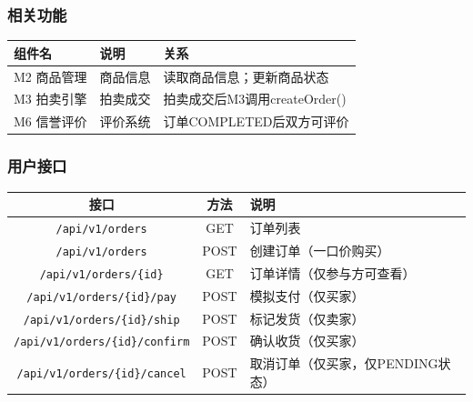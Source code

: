 \documentclass[12pt,a4paper]{ctexart}
\numberwithin{figure}{section}
\numberwithin{table}{section}
\begin{document}
\subsubsection{相关功能}

\begin{center}
\renewcommand{\arraystretch}{1.3}
\begin{tabular}{|p{3cm}|p{4cm}|p{7cm}|}
\hline
\rowcolor{tableheader}
\textbf{组件名} & \textbf{说明} & \textbf{关系} \\
\hline
M2 商品管理 & 商品信息 & 读取商品信息；更新商品状态 \\
\hline
M3 拍卖引擎 & 拍卖成交 & 拍卖成交后M3调用createOrder() \\
\hline
M6 信誉评价 & 评价系统 & 订单COMPLETED后双方可评价 \\
\hline
\end{tabular}
\end{center}

\subsubsection{用户接口}

\begin{center}
\renewcommand{\arraystretch}{1.3}
\begin{tabular}{|c|c|p{6cm}|}
\hline
\rowcolor{tableheader}
\textbf{接口} & \textbf{方法} & \textbf{说明} \\
\hline
\verb|/api/v1/orders| & GET & 订单列表 \\
\hline
\verb|/api/v1/orders| & POST & 创建订单（一口价购买） \\
\hline
\verb|/api/v1/orders/{id}| & GET & 订单详情（仅参与方可查看） \\
\hline
\verb|/api/v1/orders/{id}/pay| & POST & 模拟支付（仅买家） \\
\hline
\verb|/api/v1/orders/{id}/ship| & POST & 标记发货（仅卖家） \\
\hline
\verb|/api/v1/orders/{id}/confirm| & POST & 确认收货（仅买家） \\
\hline
\verb|/api/v1/orders/{id}/cancel| & POST & 取消订单（仅买家，仅PENDING状态） \\
\hline
\end{tabular}
\end{center}
\end{document}
